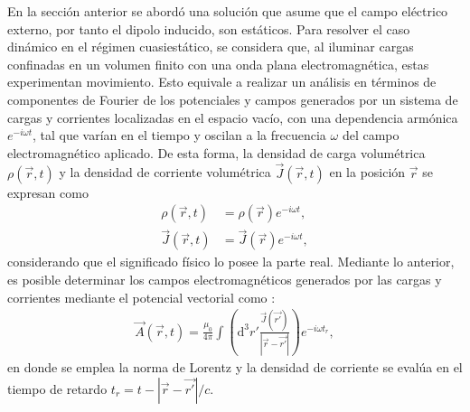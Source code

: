 En la sección anterior se abordó una solución que asume que el campo eléctrico externo,  por tanto el dipolo inducido, son estáticos. Para resolver el caso dinámico en el régimen cuasiestático, se considera que, al iluminar cargas confinadas en un volumen finito con una onda plana electromagnética, estas experimentan movimiento. Esto equivale a realizar un análisis en términos de componentes de Fourier de los potenciales y campos generados por un sistema de cargas y corrientes localizadas en el espacio vacío, con una dependencia armónica $e^{-i\omega t}$, tal que varían en el tiempo y oscilan a la frecuencia $\omega$ del campo electromagnético aplicado. De esta forma, la densidad de carga volumétrica  $\rho(\Vec{r},t)$ y la densidad de corriente volumétrica $\Vec{J}(\Vec{r},t)$  en la posición $\Vec{r}$ se expresan como \cite{Jackson}
\begin{align}
    \rho(\Vec{r},t)&=\rho(\Vec{r})e^{-i\omega t},\nonumber\\
    \Vec{J}(\Vec{r},t)&=\Vec{J}(\Vec{r})e^{-i\omega t},
    \label{armonicf}
\end{align}
considerando que el significado físico lo posee la parte real. Mediante lo anterior, es posible determinar los campos electromagnéticos generados por las cargas y corrientes mediante el potencial vectorial como \cite{Jackson}:
\begin{align}
  \Vec{A}(\Vec{r},t)=\frac{\mu_0}{4\pi}\int \left( \text{d}^3r'\frac{\Vec{J}(\Vec{r'})}{|\Vec{r}-\Vec{r'}|}\right)e^{-i\omega t_r},
  \label{Achafa}
\end{align}
en donde se emplea la norma de Lorentz \cite{Griffiths} y la densidad de corriente se evalúa en el tiempo de retardo $t_r=t-|\Vec{r}-\Vec{r'}|/c$. \\

